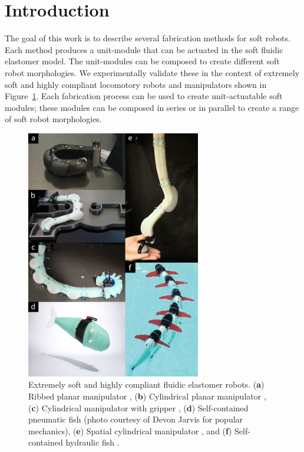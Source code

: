 
\section{Introduction}
\label{sec:Introduction}

The goal of this work is to describe several fabrication methods for soft robots. Each method produces a unit-module that can be actuated in the soft fluidic elastomer model. The unit-modules can be composed to create different soft robot morphologies.
%
We experimentally validate these in the context of extremely soft and highly compliant locomotory robots and manipulators shown in Figure~\ref{fig:intro_new}.
Each fabrication process can be used to create unit-actuatable soft modules; these modules can be composed in series or in parallel to create a range of soft robot morphologies.
\begin{figure}[!t]
  \centering
  \includegraphics[width=3in]{figures/introduction/intronew.jpg}
  \caption{Extremely soft and highly compliant fluidic elastomer robots. (\textbf{a}) Ribbed planar manipulator \citep{marchese2014design}, (\textbf{b}) Cylindrical planar manipulator \citep{marchese2014whole}, (\textbf{c}) Cylindrical manipulator with gripper \citep{katzschmann2015autonomous}, (\textbf{d}) Self-contained pneumatic fish \citep{marchese2014autonomous}(photo courtesy of Devon Jarvis for popular mechanics), (\textbf{e}) Spatial cylindrical manipulator \citep{marchese2015design}, and (\textbf{f}) Self-contained hydraulic fish \citep{katzschmann2014hydraulic}. }\label{fig:intro_new}
\end{figure}

